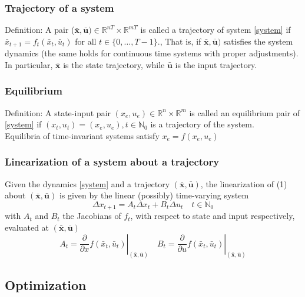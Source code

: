 \documentclass{book}
\newcommand\at[2]{\left.#1\right|_{#2}}
\newcommand{\R}{\mathbb{R}}
\newcommand{\N}{\mathbb{N}}
\theoremstyle{definition}
\theoremstyle{remark}
\theoremstyle{remark}
\begin{document}
\subsubsection{Trajectory of a system}

Definition: A pair ($\bar{\mathbf{x}},\bar{\mathbf{u}})\in\R^{nT} \times \R^{mT}$ is called a trajectory of system \eqref{system} 
if $\bar{x}_{t+1}=f_t(\bar{x}_t,\bar{u}_t)$ for all $t\in\{0,\dots,T-1\}$., That is, if $\bar{\mathbf{x}},\bar{\mathbf{u}})$ satisfies the system dynamics (the same holds for continuous time systems with proper adjustments). In particular, $\bar{\mathbf{x}}$ is the state trajectory, while $\bar{\mathbf{u}}$ is the input trajectory.

\subsubsection{Equilibrium}
Definition: A state-input pair $(x_e,u_e)\in\R^n\times\R^m$ is called an equilibrium pair of \eqref{system} 
if $(x_t,u_t)=(x_e,u_e),t\in\N_0$ is a trajectory of the system. \\
Equilibria of time-invariant systems satisfy $x_e=f(x_e,u_e)$

\subsubsection{Linearization of a system about a trajectory}
Given the dynamics \eqref{system}
and a trajectory $(\bar{\mathbf{x}},\bar{\mathbf{u}})$, the linearization of (1) about $(\bar{\mathbf{x}},\bar{\mathbf{u}})$ is given by the linear (possibly) time-varying system 
\[
    \Delta x_{t+1} = A_t\Delta x_t + B_t \Delta u_t \quad t\in\N_0
\]
with $A_t$ and $B_t$ the Jacobians of $f_t$, with respect to state and input respectively, evaluated at $(\bar{\mathbf{x}},\bar{\mathbf{u}})$
\[
    A_t = \at{\displaystyle\frac{\partial}{\partial x}f(\bar{x}_t,\bar{u}_t)}{(\bar{\mathbf{x}},\bar{\mathbf{u}})} \quad B_t = \at{\displaystyle\frac{\partial}{\partial u}f(\bar{x}_t,\bar{u}_t)}{(\bar{\mathbf{x}},\bar{\mathbf{u}})}
\]

\subsection{Optimization}
\end{document}
